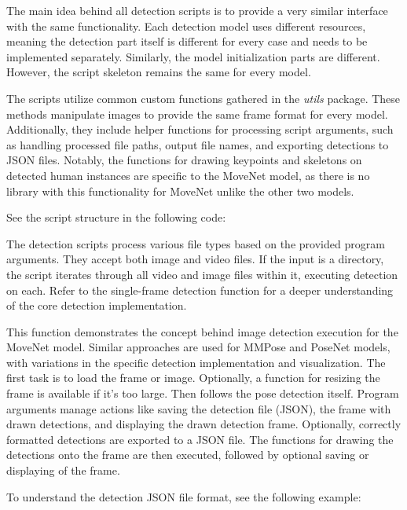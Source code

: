 The main idea behind all detection scripts is to provide a very similar interface with the same functionality. Each detection model uses different resources, meaning the detection part itself is different for every case and needs to be implemented separately. Similarly, the model initialization parts are different. However, the script skeleton remains the same for every model.

The scripts utilize common custom functions gathered in the {\em utils} package. These methods manipulate images to provide the same frame format for every model. Additionally, they include helper functions for processing script arguments, such as handling processed file paths, output file names, and exporting detections to JSON files. Notably, the functions for drawing keypoints and skeletons on detected human instances are specific to the MoveNet model, as there is no library with this functionality for MoveNet unlike the other two models.

See the script structure in the following code:


The detection scripts process various file types based on the provided program arguments. They accept both image and video files. If the input is a directory, the script iterates through all video and image files within it, executing detection on each. Refer to the single-frame detection function for a deeper understanding of the core detection implementation.


This function demonstrates the concept behind image detection execution for the MoveNet model. Similar approaches are used for MMPose and PoseNet models, with variations in the specific detection implementation and visualization. The first task is to load the frame or image. Optionally, a function for resizing the frame is available if it's too large. Then follows the pose detection itself. Program arguments manage actions like saving the detection file (JSON), the frame with drawn detections, and displaying the drawn detection frame. Optionally, correctly formatted detections are exported to a JSON file. The functions for drawing the detections onto the frame are then executed, followed by optional saving or displaying of the frame.

To understand the detection JSON file format, see the following example:

